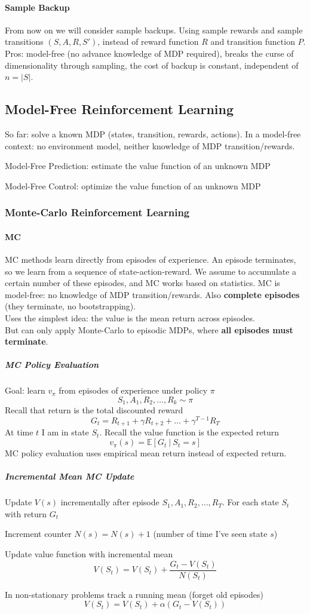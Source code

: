 \documentclass[10pt]{report}
\begin{document}
\paragraph{Sample Backup} From now on we will consider sample backups. Using sample rewards and sample transitions $(S,A,R,S')$, instead of reward function $R$ and transition function $P$.\\
Pros: model-free (no advance knowledge of MDP required), breaks the curse of dimensionality through sampling, the cost of backup is constant, independent of $n = |S|$.
\subsection{Model-Free Reinforcement Learning}
So far: solve a known MDP (states, transition, rewards, actions). In a model-free context: no environment model, neither knowledge of MDP transition/rewards.
\begin{list}{}{}
	\item Model-Free Prediction: estimate the value function of an unknown MDP
	\item Model-Free Control: optimize the value function of an unknown MDP
\end{list}
\subsubsection{Monte-Carlo Reinforcement Learning}
\paragraph{MC} MC methods learn directly from episodes of experience. An episode terminates, so we learn from a sequence of state-action-reward. We assume to accumulate a certain number of these episodes, and MC works based on statistics. MC is model-free: no knowledge of MDP transition/rewards. Also \textbf{complete episodes} (they terminate, no bootstrapping).\\
Uses the simplest idea: the value is the mean return across episodes.\\
But can only apply Monte-Carlo to episodic MDPs, where \textbf{all episodes must terminate}.
\subparagraph{MC Policy Evaluation} Goal: learn $v_\pi$ from episodes of experience under policy $\pi$
$$S_1,A_1,R_2,\ldots,R_k\sim \pi$$
Recall that return is the total discounted reward
$$G_t = R_{t+1} + \gamma R_{t+2} + \ldots + \gamma^{T-1}R_T$$
At time $t$ I am in state $S_t$. Recall the value function is the expected return $$v_\pi(s)=\mathbb{E}[G_t\:|\:S_t=s]$$
MC policy evaluation uses empirical mean return instead of expected return.
\subparagraph{Incremental Mean MC Update} Update $V(s)$ incrementally after episode $S_1,A_1,R_2,\ldots, R_T$. For each state $S_t$ with return $G_t$\begin{list}{}{}
	\item Increment counter $N(s) = N(s) + 1$ (number of time I've seen state $s$)
	\item Update value function with incremental mean
	$$V(S_t) = V(S_t) + \frac{G_t - V(S_t)}{N(S_t)}$$
\end{list}
In non-stationary problems track a running mean (forget old episodes)
$$V(S_t) = V(S_t) +\alpha(G_t-V(S_t))$$
\end{document}
